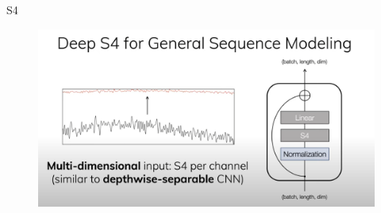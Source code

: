\documentclass{beamer}
\begin{document}
\begin{frame}{S4}
    \begin{figure}
        \centering
        \includegraphics[width=\textwidth]{S4_deep.png}
    \end{figure}
\end{frame}
\end{document}
